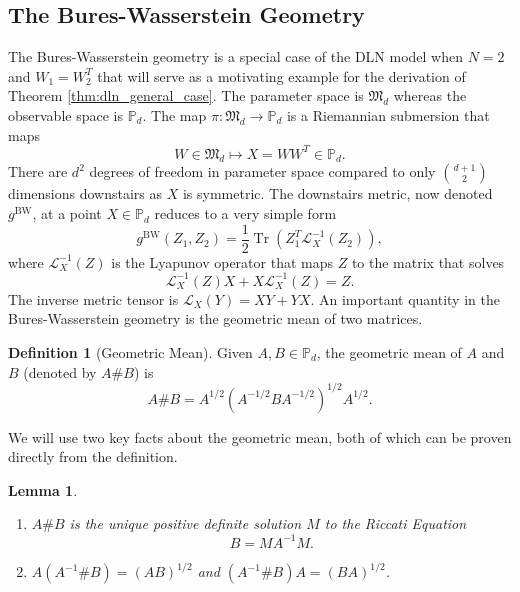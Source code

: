 \documentclass{amsart}
\DeclareMathOperator{\Tr}{Tr}
\newtheorem{lemma}[theorem]{Lemma}
\theoremstyle{definition}
\newtheorem{definition}[theorem]{Definition}
\theoremstyle{remark}
\numberwithin{equation}{section}
\begin{document}
\subsection{The Bures-Wasserstein Geometry}\label{sec:bw_geometry}
The Bures-Wasserstein geometry \cite{bhatia2019bures} is a special case of the DLN model when $N = 2$ and $W_1 = W_2^T$ that will serve as a motivating example for the derivation of Theorem \ref{thm:dln_general_case}. The parameter space is $\mathfrak{M}_d$ whereas the observable space is $\mathbb{P}_d$. The map $\pi: \mathfrak{M}_d \to \mathbb{P}_d$ is a Riemannian submersion that maps
\begin{equation*}
    W \in \mathfrak{M}_d \mapsto X = WW^T \in \mathbb{P}_d.
\end{equation*}
There are $d^2$ degrees of freedom in parameter space compared to only $\binom{d+1}{2}$ dimensions downstairs as $X$ is symmetric. The downstairs metric, now denoted $g^{\text{BW}}$, at a point $X \in \mathbb{P}_d$ reduces to a very simple form
\begin{equation}
g^\text{BW}(Z_1, Z_2) =\frac{1}{2}\Tr(Z_1^T \mathcal{L}^{-1}_X(Z_2)),
\end{equation}
where $\mathcal{L}^{-1}_X(Z)$ is the Lyapunov operator that maps $Z$ to the matrix that solves
\begin{equation}
    \mathcal{L}^{-1}_X(Z) X + X\mathcal{L}^{-1}_X(Z) = Z.
\end{equation}
The inverse metric tensor is $\mathcal{L}_X(Y) = XY + YX$. An important quantity in the Bures-Wasserstein geometry is the geometric mean of two matrices.
\begin{definition}[Geometric Mean]
Given $A, B \in \mathbb{P}_d$, the geometric mean of $A$ and $B$ (denoted by $A \# B$) is
\begin{equation}
    A\#B = A^{1/2}(A^{-1/2}BA^{-1/2})^{1/2}A^{1/2}.
\end{equation}
\end{definition}
We will use two key facts about the geometric mean, both of which can be proven directly from the definition.
\begin{lemma}\label{lem:geometric_mean_riccati}
\begin{enumerate}
    \item $A\#B$ is the unique positive definite solution $M$ to the Riccati Equation
    \begin{equation}
        B = MA^{-1}M.
    \end{equation}
    \item $A(A^{-1}\#B) = (AB)^{1/2}$ and $(A^{-1}\#B)A = (BA)^{1/2}$.
\end{enumerate}
\end{lemma}
\end{document}
